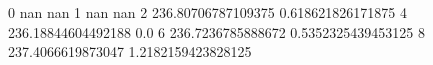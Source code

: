 0 nan nan
1 nan nan
2 236.80706787109375 0.618621826171875
4 236.18844604492188 0.0
6 236.7236785888672 0.5352325439453125
8 237.4066619873047 1.2182159423828125
